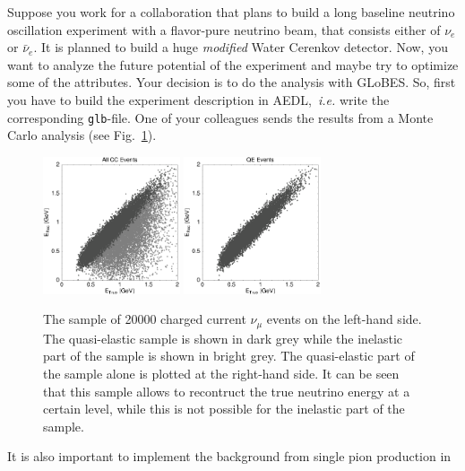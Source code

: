 \documentclass[12pt,a4paper]{article}
\theoremstyle{dotless}
\begin{document}
Suppose you work for a collaboration that plans to build a long baseline 
neutrino oscillation experiment with a flavor-pure neutrino beam, that consists 
either of $\nu_e$ or $\bar{\nu}_e$. It is planned to build a huge {\em modified} 
Water Cerenkov detector. Now, you want to analyze the future potential of the 
experiment and maybe try to optimize some of the attributes. Your decision is to
do the analysis with GLoBES. So, first you have to build the experiment description
in AEDL,~{\it i.e.} write the corresponding {\tt glb}-file. One of your colleagues
sends the results from a Monte Carlo analysis (see Fig.~\ref{fig:mccc}). 
%
\begin{figure}[h!]
  \begin{center}
    \includegraphics[width=0.36\textwidth]{CCevents.eps} \hspace{0.5cm}
    \includegraphics[width=0.36\textwidth]{QEevents.eps}
  \end{center}
  \vspace{-0.7 cm}
  \caption{\small The sample of 20000 charged current $\nu_\mu$ events on the left-hand side. The
  quasi-elastic sample is shown in dark grey while the inelastic part of the sample is
  shown in bright grey. The quasi-elastic part of the sample alone is plotted at the right-hand
  side. It can be seen that this sample allows to recontruct the true neutrino energy at a
  certain level, while this is not possible for the inelastic part of the sample.}
  \label{fig:mccc}
\end{figure}
%
It is also important to implement the background from single pion production in 
\end{document}
